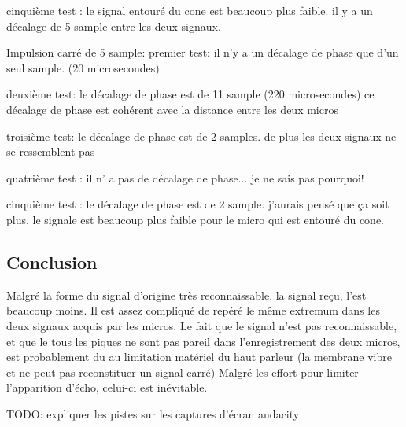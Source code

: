 \documentclass[12pt,a4paper]{article}
\begin{document}
		cinquième test :
			le signal entouré du cone est beaucoup plus faible.
			il y a un décalage de 5 sample entre les deux signaux.

	Impulsion carré de 5 sample:
		premier test:
			il n'y a un décalage de phase que d'un seul sample. (20 microsecondes)

		deuxième test:
			le décalage de phase est de 11 sample (220 microsecondes)
			ce décalage de phase est cohérent avec la distance entre les deux micros

		troisième test:
			le décalage de phase est de 2 samples.
			de plus les deux signaux ne se ressemblent pas 

		quatrième test :
			il n' a pas de décalage de phase... je ne sais pas pourquoi!

		cinquième test :
	        le décalage de phase est de 2 sample. j'aurais pensé que ça soit plus.
	        le signale est beaucoup plus faible pour le micro qui est entouré du cone. 


\subsection{Conclusion}
	Malgré la forme du signal d'origine très reconnaissable, la signal reçu, l'est beaucoup moins. Il est assez compliqué de repéré le même extremum dans les deux signaux acquis par les micros.
	Le fait que le signal n'est pas reconnaissable, et que le tous les piques ne sont pas pareil dans l'enregistrement des deux micros, est probablement du au limitation matériel du haut parleur (la membrane vibre et ne peut pas reconstituer un signal carré)
	Malgré les effort pour limiter l'apparition d'écho, celui-ci est inévitable.



TODO: expliquer les pistes sur les captures d'écran audacity
\end{document}
